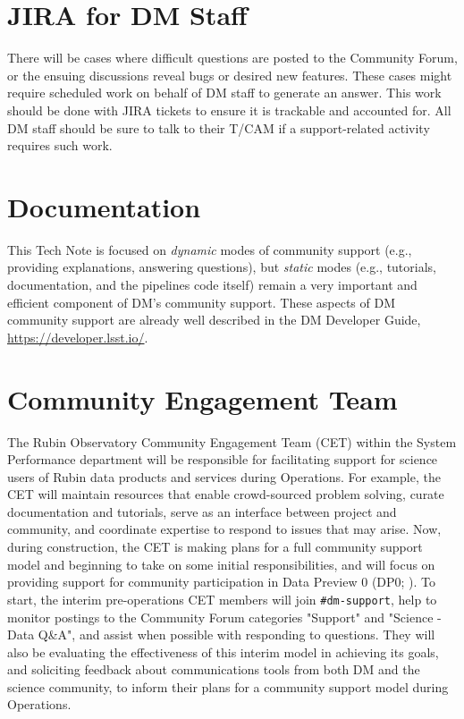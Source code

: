 \documentclass[DM,lsstdraft,authoryear,toc]{lsstdoc}
\begin{document}
\section{JIRA for DM Staff}\label{sec:jira}

There will be cases where difficult questions are posted to the Community Forum, or the ensuing discussions reveal bugs or desired new features.
These cases might require scheduled work on behalf of DM staff to generate an answer.
This work should be done with JIRA tickets to ensure it is trackable and accounted for.
All DM staff should be sure to talk to their T/CAM if a support-related activity requires such work.

\section{Documentation}\label{sec:doc}

This Tech Note is focused on {\it dynamic} modes of community support (e.g., providing explanations, answering questions), but {\it static} modes (e.g., tutorials, documentation, and the pipelines code itself) remain a very important and efficient component of DM's community support.
These aspects of DM community support are already well described in the DM Developer Guide, \url{https://developer.lsst.io/}.

\section{Community Engagement Team}\label{sec:cet}

The Rubin Observatory Community Engagement Team (CET) within the System Performance department will be responsible for facilitating support for science users of Rubin data products and services during Operations.
For example, the CET will maintain resources that enable crowd-sourced problem solving, curate documentation and tutorials, serve as an interface between project and community, and coordinate expertise to respond to issues that may arise.
Now, during construction, the CET is making plans for a full community support model and beginning to take on some initial responsibilities, and will focus on providing support for community participation in Data Preview 0 (DP0; ).
To start, the interim pre-operations CET members will join {\tt \#dm-support}, help to monitor postings to the Community Forum categories "Support" and "Science - Data Q\&A", and assist when possible with responding to questions.
They will also be evaluating the effectiveness of this interim model in achieving its goals, and soliciting feedback about communications tools from both DM and the science community, to inform their plans for a community support model during Operations.
\end{document}
